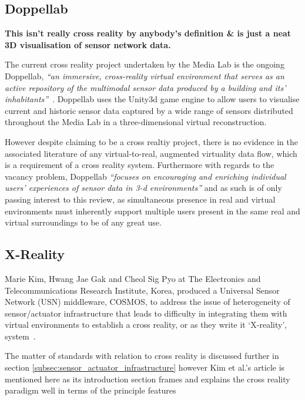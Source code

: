 \subsection{Doppellab}
\label{subsec:doppellab}

\textbf{This isn't really cross reality by anybody's definition \& is just a neat 3D visualisation of sensor network data.}

The current cross reality project undertaken by the Media Lab is the ongoing Doppellab, \textit{``an immersive, cross-reality virtual environment that serves as an active repository of the multimodal sensor data produced by a building and its' inhabitants''}~\cite{Dublon2011, Dublon2011a}. Doppellab uses the Unity3d game engine to allow users to visualise current and historic sensor data captured by a wide range of sensors distributed throughout the Media Lab in a three-dimensional virtual reconstruction.

However despite claiming to be a cross realtiy project, there is no evidence in the associated literature of any virtual-to-real, augmented virtuality data flow, which is a requirement of a cross reality system. Furthermore with regards to the vacancy problem, Doppellab \textit{``focuses on encouraging and enriching individual users' experiences of sensor data in 3-d environments''} and as such is of only passing interest to this review, as simultaneous presence in real and virtual environments must inherently support multiple users present in the same real and virtual surroundings to be of any great use.

\subsection{X-Reality}
\label{subsec:x-reality}
Marie Kim, Hwang Jae Gak and Cheol Sig Pyo at The Electronics and Telecommunications Research Institute, Korea, produced a Universal Sensor Network (USN) middleware, COSMOS, to address the issue of heterogeneity of sensor/actuator infrastructure that leads to difficulty in integrating them with virtual environments to establish a cross reality, or as they write it `X-reality', system~\cite{kim:practical}.

The matter of standards with relation to cross reality is discussed further in section \ref{subsec:sensor_actuator_infrastructure} however Kim et al.'s article is mentioned here as its introduction section frames and explains the cross reality paradigm well in terms of the principle features

